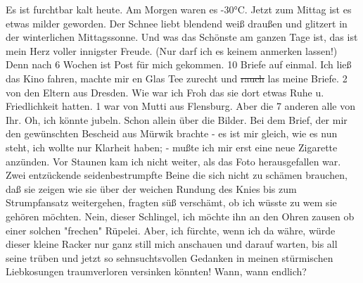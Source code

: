 \def\day{5. Dezember 1943.}
\mktitle

Es ist furchtbar kalt heute.
Am Morgen waren es -30°C.
Jetzt zum Mittag ist es etwas milder geworden.
Der Schnee liebt blendend wei{\ss} drau{\ss}en und glitzert in der winterlichen Mittagssonne.
Und was das Sch\"{o}nste am ganzen Tage ist, das ist mein Herz voller innigster Freude.
(Nur darf ich es keinem anmerken lassen!)
Denn nach 6 Wochen ist Post f\"{u}r mich gekommen.
10 Briefe auf einmal.
Ich lie{\ss} das Kino fahren, machte mir en Glas Tee zurecht und \st{rauch} las meine Briefe.
2 von den Eltern aus Dresden.
Wie war ich Froh das sie dort etwas Ruhe u. Friedlichkeit hatten.
1 war von Mutti aus Flensburg.
Aber die 7 anderen alle von Ihr.
Oh, ich k\"{o}nnte jubeln.
Schon allein \"{u}ber die Bilder.
Bei dem Brief, der mir den gew\"{u}nschten Bescheid aus M\"{u}rwik brachte - es ist mir gleich, wie es nun steht, ich wollte nur Klarheit haben; - mu{\ss}te ich mir erst eine neue Zigarette anz\"{u}nden.
Vor Staunen kam ich nicht weiter, als das Foto herausgefallen war.
Zwei entz\"{u}ckende seidenbestrumpfte Beine die sich nicht zu sch\"{a}men brauchen, da{\ss} sie zeigen wie sie \"{u}ber der weichen Rundung des Knies bis zum Strumpfansatz weitergehen, fragten s\"{u}{\ss} versch\"{a}mt, ob ich w\"{u}sste zu wem sie geh\"{o}ren m\"{o}chten.
Nein, dieser Schlingel, ich m\"{o}chte ihn an den Ohren zausen ob einer solchen "frechen" R\"{u}pelei.
Aber, ich f\"{u}rchte, wenn ich da w\"{a}hre, w\"{u}rde dieser kleine Racker nur ganz still mich anschauen und darauf warten, bis all seine tr\"{u}ben und jetzt so sehnsuchtsvollen Gedanken in meinen st\"{u}rmischen Liebkosungen traumverloren versinken k\"{o}nnten!
Wann, wann endlich?

\clearpage
